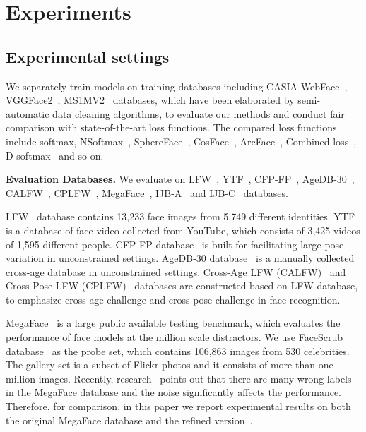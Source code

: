\documentclass[journal,comsoc]{IEEEtran}
\begin{document}
\section{Experiments}
\label{sec:exp}
\subsection{Experimental settings}
We separately train models on training databases including CASIA-WebFace~\cite{Yi2014CASIA}, VGGFace2~\cite{Cao18}, MS1MV2~\cite{guo2016msceleb} databases, which have been elaborated by semi-automatic data cleaning algorithms, to evaluate our methods and conduct fair comparison with state-of-the-art loss functions. The compared loss functions include softmax, NSoftmax~\cite{wang2017normface}, SphereFace~\cite{Liu2017SphereFace}, CosFace~\cite{Wang2018CosFace}, ArcFace~\cite{deng2019arcface}, Combined loss~\cite{deng2019arcface}, D-softmax~\cite{he2019softmax} and so on. 


\textbf{Evaluation Databases.} We evaluate on LFW~\cite{LFWTech}, YTF~\cite{Wolf2011Face}, CFP-FP~\cite{sengupta2016frontal}, AgeDB-30~\cite{moschoglou2017agedb}, CALFW~\cite{zheng2017CALFW}, CPLFW~\cite{CPLFWTech}, MegaFace~\cite{kemelmacher2016megaface}, IJB-A~\cite{klare2015pushing} and IJB-C~\cite{maze2018iarpa} databases. 

LFW~\cite{LFWTech} database contains 13,233 face images from 5,749 different identities. YTF~\cite{Wolf2011Face} is a database of face video collected from YouTube, which consists of 3,425 videos of 1,595 different people. CFP-FP database~\cite{sengupta2016frontal} is built for facilitating large pose variation in unconstrained settings. AgeDB-30 database~\cite{moschoglou2017agedb} is a manually collected cross-age database in unconstrained settings. Cross-Age LFW (CALFW)~\cite{zheng2017CALFW} and Cross-Pose LFW (CPLFW)~\cite{CPLFWTech} databases are constructed based on LFW database, to emphasize cross-age challenge and cross-pose challenge in face recognition. 

MegaFace~\cite{kemelmacher2016megaface} is a large public available testing benchmark, which evaluates the performance of face models at the million scale distractors. We use FaceScrub database~\cite{Ng2015A} as the probe set, which contains 106,863 images from 530 celebrities. The gallery set is a subset of Flickr photos and it consists of more than one million images. Recently, research~\cite{deng2019arcface} points out that there are many wrong labels in the MegaFace database and the noise significantly affects the performance. Therefore, for comparison, in this paper we report experimental results on both the original MegaFace database and the refined version~\cite{deng2019arcface}.
\end{document}
